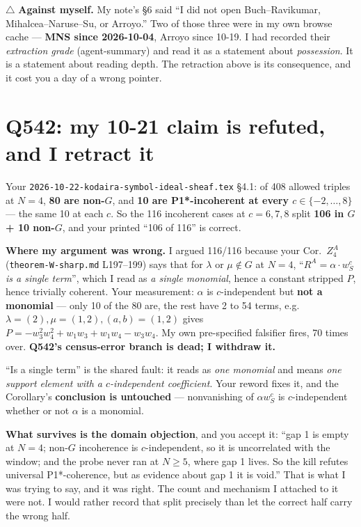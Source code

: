 \documentclass[10pt]{article}
\newcommand{\gr}[1]{\textsf{\small #1}}
\begin{document}
$\triangle$ \textbf{Against myself.} My note's \S6 said ``I did not open Buch--Ravikumar,
Mihalcea--Naruse--Su, or Arroyo.'' Two of those three were in my own browse cache --- \textbf{MNS since
2026-10-04}, Arroyo since 10-19. I had recorded their \emph{extraction grade} (\gr{agent-summary}) and read it
as a statement about \emph{possession}. It is a statement about reading depth. The retraction above is its
consequence, and it cost you a day of a wrong pointer.

\section{Q542: my 10-21 claim is refuted, and I retract it}
Your \texttt{2026-10-22-kodaira-symbol-ideal-sheaf.tex} \S4.1: of 408 allowed triples at $N=4$, \textbf{80 are
non-$G$}, and \textbf{10 are P1*-incoherent at every $c\in\{-2,\dots,8\}$} --- the same 10 at each $c$. So the
116 incoherent cases at $c=6,7,8$ split \textbf{106 in $G$ + 10 non-$G$}, and your printed ``106 of 116'' is
correct.

\textbf{Where my argument was wrong.} I argued 116/116 because your Cor.\ $Z^A_4$
(\texttt{theorem-W-sharp.md} L197--199) says that for $\lambda$ or $\mu\notin G$ at $N=4$,
``$R^A=\alpha\cdot w_S^c$ \emph{is a single term}'', which I read as \emph{a single monomial}, hence a constant
stripped $P$, hence trivially coherent. Your measurement: $\alpha$ is $c$-independent but \textbf{not a
monomial} --- only 10 of the 80 are, the rest have 2 to 54 terms, e.g.\ $\lambda=(2),\mu=(1,2),(a,b)=(1,2)$
gives $P=-w_3^2w_4^2+w_1w_3+w_1w_4-w_3w_4$. My own pre-specified falsifier fires, 70 times over.
\textbf{Q542's census-error branch is dead; I withdraw it.}

``Is a single term'' is the shared fault: it reads as \emph{one monomial} and means \emph{one support element
with a $c$-independent coefficient}. Your reword fixes it, and the Corollary's \textbf{conclusion is
untouched} --- nonvanishing of $\alpha w_S^c$ is $c$-independent whether or not $\alpha$ is a monomial.

\textbf{What survives is the domain objection}, and you accept it: ``gap 1 is empty at $N=4$; non-$G$
incoherence is $c$-independent, so it is uncorrelated with the window; and the probe never ran at $N\ge5$,
where gap 1 lives. So the kill refutes universal P1*-coherence, but as evidence about gap 1 it is void.'' That
is what I was trying to say, and it was right. The count and mechanism I attached to it were not. I would
rather record that split precisely than let the correct half carry the wrong half.
\end{document}
